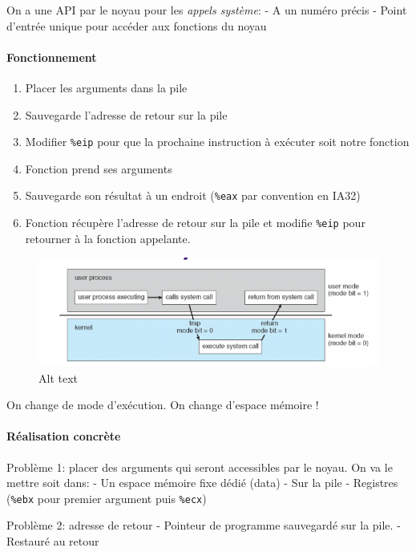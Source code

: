 On a une API par le noyau pour les \emph{appels système}: - A un numéro
précis - Point d'entrée unique pour accéder aux fonctions du noyau

\paragraph{Fonctionnement}\label{fonctionnement}

\begin{enumerate}
\def\labelenumi{\arabic{enumi}.}
\tightlist
\item
  Placer les arguments dans la pile
\item
  Sauvegarde l'adresse de retour sur la pile
\item
  Modifier \texttt{\%eip} pour que la prochaine instruction à exécuter
  soit notre fonction
\item
  Fonction prend ses arguments
\item
  Sauvegarde son résultat à un endroit (\texttt{\%eax} par convention en
  IA32)
\item
  Fonction récupère l'adresse de retour sur la pile et modifie
  \texttt{\%eip} pour retourner à la fonction appelante.
\end{enumerate}

\begin{figure}
\centering
\includegraphics{image-12.png}
\caption{Alt text}
\end{figure}

On change de mode d'exécution. On change d'espace mémoire !

\paragraph{Réalisation concrète}\label{ruxe9alisation-concruxe8te}

Problème 1: placer des arguments qui seront accessibles par le noyau. On
va le mettre soit dans: - Un espace mémoire fixe dédié (data) - Sur la
pile - Registres (\texttt{\%ebx} pour premier argument puis
\texttt{\%ecx})

Problème 2: adresse de retour - Pointeur de programme sauvegardé sur la
pile. - Restauré au retour

